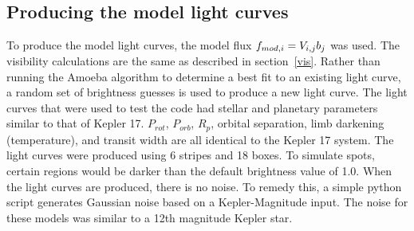









\subsection{Producing the model light curves \label{modelLC}}
To produce the model light curves, the model flux $\mbox{$f_{mod,i}$} = V_{i,j} b_j$ was used. The visibility calculations are the same as described in section~\ref{vis}. Rather than running the Amoeba algorithm to determine a best fit to an existing light curve, a random set of brightness guesses is used to produce a new light curve. The light curves that were used to test the code had stellar and planetary parameters similar to that of Kepler 17. $P_{rot}$, $P_{orb}$, $R_p$, orbital separation, limb darkening (temperature), and transit width are all identical to the Kepler 17 system. The light curves were produced using 6 stripes and 18 boxes. To simulate spots, certain regions would be darker than the default brightness value of 1.0. When the light curves are produced, there is no noise. To remedy this, a simple python script generates Gaussian noise based on a Kepler-Magnitude input. The noise for these models was similar to a 12th magnitude Kepler star.




